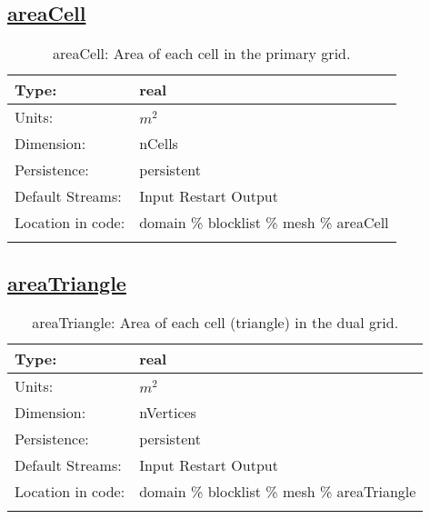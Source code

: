 \subsection[areaCell]{\hyperref[sec:var_tab_mesh]{areaCell}}
\label{subsec:var_sec_mesh_areaCell}
\begin{center}
\begin{longtable}{| p{2.0in} | p{4.0in} |}
        \hline 
        Type: & real \\
        \hline 
        Units: & $m^2$ \\
        \hline 
        Dimension: & nCells \\
        \hline 
        Persistence: & persistent \\
        \hline 
		 Default Streams: & Input Restart Output  \\
        \hline 
		 Location in code: & domain \% blocklist \% mesh \% areaCell \\
		 \hline 
    \caption{areaCell: Area of each cell in the primary grid.}
\end{longtable}
\end{center}
\subsection[areaTriangle]{\hyperref[sec:var_tab_mesh]{areaTriangle}}
\label{subsec:var_sec_mesh_areaTriangle}
\begin{center}
\begin{longtable}{| p{2.0in} | p{4.0in} |}
        \hline 
        Type: & real \\
        \hline 
        Units: & $m^2$ \\
        \hline 
        Dimension: & nVertices \\
        \hline 
        Persistence: & persistent \\
        \hline 
		 Default Streams: & Input Restart Output  \\
        \hline 
		 Location in code: & domain \% blocklist \% mesh \% areaTriangle \\
		 \hline 
    \caption{areaTriangle: Area of each cell (triangle) in the dual grid.}
\end{longtable}
\end{center}
